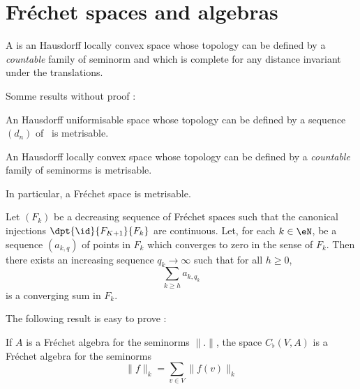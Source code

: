 
\section{Fréchet spaces and algebras}

\begin{definition}
A  is an Hausdorff locally convex space whose topology can be defined by a \emph{countable} family of seminorm and which is complete for any distance invariant under the translations.
\end{definition}

Somme results without proof :
\begin{lemma}
 An Hausdorff uniformisable space whose topology can be defined by a sequence $(d_n)$ of \ecarts\ is metrisable.
\end{lemma}

\begin{lemma}
An Hausdorff locally convex space whose topology can be defined by a \emph{countable} family of seminorms is metrisable.
\end{lemma}

In particular, a Fréchet space is metrisable.

\begin{lemma} \label{prop_suiteFk}
Let $(F_k)$ be a decreasing sequence of Fréchet spaces such that the canonical injections $\dpt{\id}{F_{K+1}}{F_k}$ are continuous. Let, for each $k\in\eN$, be a sequence $(a_{k,q})$ of points in $F_k$ which converges to zero in the sense of $F_k$. Then there exists an increasing sequence $q_k\to\infty$ such that for all $h\geq 0$, 
\[ 
  \sum_{k\geq h}a_{k,q_k}
\]
is a converging sum in $F_k$.
\end{lemma}

The following result is easy to prove :

\begin{proposition}
If $A$ is a Fréchet algebra for the seminorms $\| . \|$, the space $C_{\flat}(V,A)$ is a Fréchet algebra for the seminorms 
\[ 
  \| f \|_k=\sum_{v\in V}\| f(v) \|_k
\]
\end{proposition}


